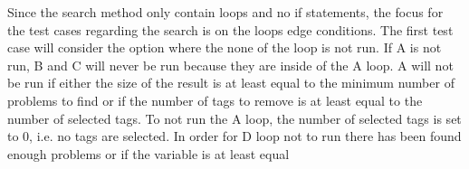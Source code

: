 Since the search method only contain loops and no if statements, the focus for the test cases regarding the search is on the loops edge conditions.
The first test case will consider the option where the none of the loop is not run.
If A is not run, B and C will never be run because they are inside of the A loop.
A will not be run if either the size of the result is at least equal to the minimum number of problems to find or if the number of tags to remove is at least equal to the number of selected tags.
To not run the A loop, the number of selected tags is set to 0, i.e. no tags are selected.
In order for D loop not to run there has been found enough problems or if the  variable is at least equal